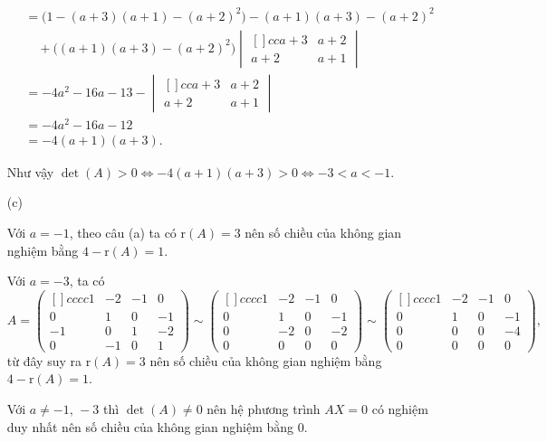 \begin{enumerate}
{\begin{align*}
            & = \Big(1-(a+3)(a+1) - (a+2)^2\Big) - (a+1)(a+3) - (a+2)^2 \\ 
            & \quad + \Big((a+1)(a+3) - (a+2)^2\Big)\begin{vmatrix}[]{cc}
                a+3 & a+2 \\
                a+2 & a+1 
            \end{vmatrix} \\
            & = -4a^2 - 16a - 13 - \begin{vmatrix}[]{cc}
                a+3 & a+2 \\
                a+2 & a+1 
            \end{vmatrix} \\
            & = -4a^2 - 16a - 12 \\
            & = -4(a+1)(a+3).
        \end{align*}

        Như vậy $\det (A) > 0 \Leftrightarrow -4(a+1)(a+3) > 0 \Leftrightarrow -3 < a < -1$.
    }
    \item[(c)] {
        Với $a = -1$, theo câu (a) ta có $\text{r}(A) = 3$ nên số chiều của không gian nghiệm bằng $4 - \text{r}(A) = 1$.

        Với $a = -3$, ta có $$A = \begin{pmatrix}[]{cccc}
            1 & -2 & -1 & 0 \\
            0 & 1 & 0 & -1 \\
            -1 & 0 & 1 & -2 \\
            0 & -1 & 0 & 1 
        \end{pmatrix} \sim \begin{pmatrix}[]{cccc}
            1 & -2 & -1 & 0 \\
            0 & 1 & 0 & -1 \\
            0 & -2 & 0 & -2 \\
            0 & 0 & 0 & 0 
        \end{pmatrix} \sim \begin{pmatrix}[]{cccc}
            1 & -2 & -1 & 0 \\
            0 & 1 & 0 & -1 \\
            0 & 0 & 0 & -4 \\
            0 & 0 & 0 & 0 
        \end{pmatrix},$$ từ đây suy ra $\text{r}(A) = 3$ nên số chiều của không gian nghiệm bằng $4 - \text{r}(A) = 1$.

        Với $a \ne -1,\,-3$ thì $\det (A) \ne 0$ nên hệ phương trình $AX = 0$ có nghiệm duy nhất nên số chiều của không gian nghiệm bằng 0.
    }
\end{enumerate}

